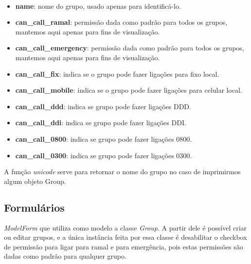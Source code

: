 \documentclass[letterpaper,10pt,brazil]{sphinxmanual}
\begin{document}
\begin{fulllineitems}
\label{apps/groups:groups.models.Group}~\begin{itemize}
\item {} 
\textbf{name}: nome do grupo, usado apenas para identificá-lo.

\item {} 
\textbf{can\_call\_ramal}: permissão dada como padrão para todos os grupos, mantemos aqui apenas para fins de visualização.

\item {} 
\textbf{can\_call\_emergency}: permissão dada como padrão para todos os grupos, mantemos aqui apenas para fins de visualização.

\item {} 
\textbf{can\_call\_fix}: indica se o grupo pode fazer ligações para fixo local.

\item {} 
\textbf{can\_call\_mobile}: indica se o grupo pode fazer ligações para celular local.

\item {} 
\textbf{can\_call\_ddd}: indica se grupo pode fazer ligações DDD.

\item {} 
\textbf{can\_call\_ddi}: indica se grupo pode fazer ligações DDI.

\item {} 
\textbf{can\_call\_0800}: indica se grupo pode fazer ligações 0800.

\item {} 
\textbf{can\_call\_0300}: indica se grupo pode fazer ligações 0300.

\end{itemize}

A função \emph{unicode} serve para retornar o nome do grupo no caso de imprimirmos algum objeto Group.

\end{fulllineitems}



\subsection{Formulários}
\label{apps/groups:module-groups.forms}\label{apps/groups:formularios}

\begin{fulllineitems}
\label{apps/groups:groups.forms.GroupForm}
\emph{ModelForm} que utiliza como modelo a classe \emph{Group}. A partir dele é possível criar ou editar grupos, e a única instância feita por essa classe é desabilitar o checkbox de permissão para ligar para ramal e para emergência, pois estas permissões são dadas como padrão para qualquer grupo.

\end{fulllineitems}
\end{document}
